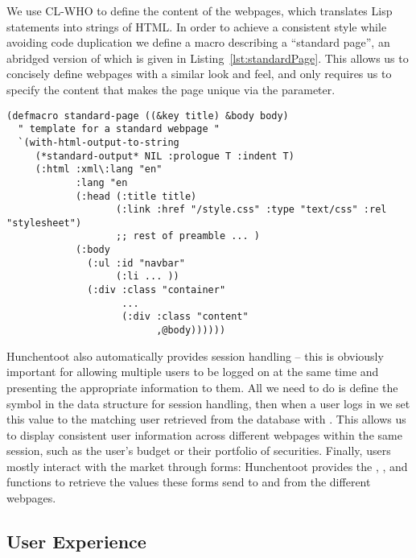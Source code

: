 We use CL-WHO to define the content of the webpages, which translates Lisp
statements into strings of HTML. In order to achieve a consistent style while
avoiding code duplication we define a macro describing a ``standard page'', an
abridged version of which is given in Listing~\ref{lst:standardPage}. This
allows us to concisely define webpages with a similar look and feel, and only
requires us to specify the content that makes the page unique via the
 parameter.

\begin{lstlisting}[float,
	label={lst:standardPage},
	caption={Macroising webpage definitions}]
(defmacro standard-page ((&key title) &body body)
  " template for a standard webpage "
  `(with-html-output-to-string
     (*standard-output* NIL :prologue T :indent T)
     (:html :xml\:lang "en"
            :lang "en
            (:head (:title title)
                   (:link :href "/style.css" :type "text/css" :rel "stylesheet")
                   ;; rest of preamble ... )
            (:body
              (:ul :id "navbar"
                   (:li ... ))
              (:div :class "container"
                    ...
                    (:div :class "content"
                          ,@body))))))
\end{lstlisting}

Hunchentoot also automatically provides session handling -- this is obviously
important for allowing multiple users to be logged on at the same time and
presenting the appropriate information to them. All we need to do is define the
symbol  in the data structure for session handling, then
when a user logs in we set this value to the matching user retrieved from the
database with . This allows us to display
consistent user information across different webpages within the same session,
such as the user's budget or their portfolio of securities. Finally, users
mostly interact with the market through forms: Hunchentoot provides the
, , and  functions to
retrieve the values these forms send to and from the different webpages.


\subsection{User Experience}

\label{sec:user-experience}

